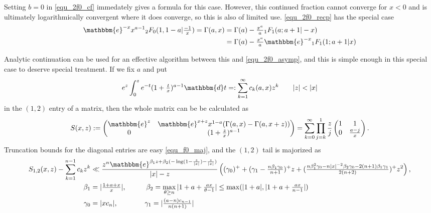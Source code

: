 \documentclass[12pt]{article}
\newcommand{\ee}[0] {\mathbbm{e}}
\newcommand{\dd}[0] {\mathbbm{d}}
\numberwithin{equation}{section}
\begin{document}
Setting $b=0$ in \eqref{equ_2f0_cf} immedately gives a formula for this case. However, this continued fraction cannot converge for $x<0$ and is ultimately logarithmically convergent where it does converge, so this is also of limited use.
\eqref{equ_2f0_recp} has the special case
\begin{align*}
\ee^{-x} x^{a-1} {}_2 F_0(1,1-a|\tfrac{-1}{x}) = \Gamma(a, x) &= \Gamma(a) - \tfrac{x^a}{a} {}_1 F_1(a;a+1|-x)\\
&= \Gamma(a) - \tfrac{x^a}{a} \ee^{-x} {}_1 F_1(1;a+1|x)
\end{align*}

Analytic continuation can be used for an effective algorithm between this and \eqref{equ_2f0_asymp}, and this is simple enough in this special case to deserve special treatment. If we fix $a$ and put
\begin{equation*}
e^z \int_0^z  e^{-t} (1+\tfrac{t}{x})^{a-1} \dd t =: \sum_{k=1}^{\infty} c_k(a,x) z^k \quad \quad |z| < |x|
\end{equation*}
in the $(1,2)$ entry of a matrix, then the whole matrix can be be calculated as
\begin{equation}
\label{equ_gamma_upper_transport}
S(x,z) := \begin{pmatrix}
\ee^z & \ee^{x+z} x^{1-a} (\Gamma(a,x) - \Gamma(a,x+z))\\
0 & (1+\tfrac{z}{x})^{a-1}
\end{pmatrix} = \sum_{k=0}^{\infty} \prod_{j=k}^{1} \frac{z}{j} \begin{pmatrix} 1 & 1 \\ 0 & \tfrac{a-j}{x} \end{pmatrix}\text{.}
\end{equation}
Truncation bounds for the diagonal entries are easy \eqref{equ_f0_maj}, and the $(1,2)$ tail is majorized as
\begin{align*}
S_{1,2}(x,z) - \sum_{k=1}^{n-1} c_k z^k & \ll \frac{z^n \ee^{\beta_1 z + \beta_2(- \log(1-\frac{z}{|x|})-\frac{z}{|x|})}}{|x| - z} \left((\gamma_0)^{+} + (\gamma_1-\tfrac{n \beta_1 \gamma_0}{n+1})^{+} z +(\tfrac{n \beta_1^2 \gamma_0 -n |x|^{-2} \beta_2 \gamma_0 -2(n+1)\beta_1 \gamma_1}{2(n+2)})^{+} z^2 \right)\text{,}\\
\beta_1 &= |\tfrac{1+a+x}{x}|\text{,} \quad \quad \quad
\beta_2 =  \max_{\theta \ge n} |1+a+\tfrac{a x}{\theta-1}| \le \max(|1+a|, |1+a + \tfrac{a x}{n-1}|)\\
\gamma_0 &= |x c_n|\text{,} \quad \quad \quad \quad \gamma_1 = |\tfrac{(a-n) c_{n-1}}{n(n+1)}| 
\end{align*}
\end{document}
